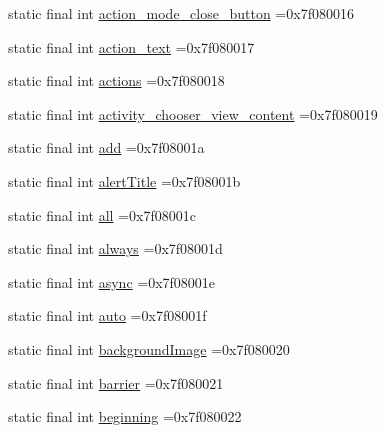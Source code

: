 \begin{DoxyCompactItemize}
static final int \mbox{\hyperlink{classcom_1_1example_1_1trainawearapplication_1_1_r_1_1id_a54407b6c97eea70df63fadc1bcdba8a5}{action\+\_\+mode\+\_\+close\+\_\+button}} =0x7f080016
\item 
static final int \mbox{\hyperlink{classcom_1_1example_1_1trainawearapplication_1_1_r_1_1id_a6cd80a65990deae4eafca67d5211f31f}{action\+\_\+text}} =0x7f080017
\item 
static final int \mbox{\hyperlink{classcom_1_1example_1_1trainawearapplication_1_1_r_1_1id_a0d7762871bed6af7aba9440ae1335349}{actions}} =0x7f080018
\item 
static final int \mbox{\hyperlink{classcom_1_1example_1_1trainawearapplication_1_1_r_1_1id_aeec633d954302b5328a5a64795c10e8a}{activity\+\_\+chooser\+\_\+view\+\_\+content}} =0x7f080019
\item 
static final int \mbox{\hyperlink{classcom_1_1example_1_1trainawearapplication_1_1_r_1_1id_af136009b670dbb7a8e938defb4f36053}{add}} =0x7f08001a
\item 
static final int \mbox{\hyperlink{classcom_1_1example_1_1trainawearapplication_1_1_r_1_1id_af6ae44e7c2f558fd3f5597cb9372e41c}{alert\+Title}} =0x7f08001b
\item 
static final int \mbox{\hyperlink{classcom_1_1example_1_1trainawearapplication_1_1_r_1_1id_a10f6a64bc346559fbe66518a02fd2639}{all}} =0x7f08001c
\item 
static final int \mbox{\hyperlink{classcom_1_1example_1_1trainawearapplication_1_1_r_1_1id_ac8b12d3937807d450f91d9fa8a60b2e3}{always}} =0x7f08001d
\item 
static final int \mbox{\hyperlink{classcom_1_1example_1_1trainawearapplication_1_1_r_1_1id_aa3f4a9e5cad114d08be4395bad8b6c5a}{async}} =0x7f08001e
\item 
static final int \mbox{\hyperlink{classcom_1_1example_1_1trainawearapplication_1_1_r_1_1id_a4200f03a9fd397850fa13d4d105ab21e}{auto}} =0x7f08001f
\item 
static final int \mbox{\hyperlink{classcom_1_1example_1_1trainawearapplication_1_1_r_1_1id_a71b2dd3d9a6a3360a00c9ecdd9937006}{background\+Image}} =0x7f080020
\item 
static final int \mbox{\hyperlink{classcom_1_1example_1_1trainawearapplication_1_1_r_1_1id_a5f7d9c16b722ed4cf46b077528f3c9a8}{barrier}} =0x7f080021
\item 
static final int \mbox{\hyperlink{classcom_1_1example_1_1trainawearapplication_1_1_r_1_1id_ab2581750e16d6b5ddccc1a39757e4cd9}{beginning}} =0x7f080022
\item 

\end{DoxyCompactItemize}
